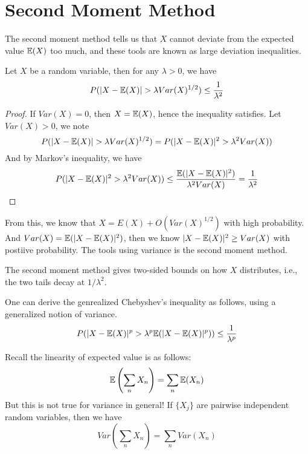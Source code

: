 \section{Second Moment Method}
The second moment method tells us that $X$ cannot deviate from the expected value $\mathbb{E}(X)$ too much, and these tools are known as large deviation inequalities.
\begin{thm}
    Let $X$ be a random variable, then for any $\lambda>0$, we have 
    \begin{equation*}
        P(|X-\E(X)|>\lambda Var(X)^{1/2})\leq\frac{1}{\lambda^2}
    \end{equation*}
\end{thm}
\begin{proof}
    If $Var(X)=0$, then $X=\mathbb{E}(X)$, hence the inequality satisfies. Let $Var(X)>0$, we note 
    \begin{equation*}
        P(|X-\E(X)|>\lambda Var(X)^{1/2})=P(|X-\E(X)|^2>\lambda^2 Var(X))
    \end{equation*}
    And by Markov's inequality, we have 
    \begin{equation*}
        P(|X-\mathbb{E}(X)|^2>\lambda^2 Var(X))\leq\frac{\mathbb{E}(|X-\mathbb{E}(X)|^2)}{\lambda^2Var(X)}=\frac{1}{\lambda^2}
    \end{equation*}
\end{proof}
From this, we know that $X=E(X)+O(Var(X)^{1/2})$ with high probability. And $Var(X)=\mathbb{E}(|X-\mathbb{E}(X)|^2)$, then we know $|X-\mathbb{E}(X)|^2\geq Var(X)$ with postiive probability. The tools using variance is the second moment method.
\begin{warn}
    The second moment method gives two-sided bounds on how $X$ distributes, i.e., the two tails decay at $1/\lambda^2$.
\end{warn}
\begin{example}
    One can derive the genrealized Chebyshev's inequality as follows, using a generalized notion of variance.
    \begin{equation*}
        P(|X-\mathbb{E}(X)|^p>\lambda^p \mathbb{E}(|X-\mathbb{E}(X)|^p))\leq\frac{1}{\lambda^p}
    \end{equation*}
\end{example}
Recall the linearity of expected value is as follows:
\begin{equation*}
    \mathbb{E}\left(\sum_n X_n\right)=\sum_n \mathbb{E}(X_n)
\end{equation*}
But this is not true for variance in general! If $\{X_j\}$ are pairwise independent random variables, then we have 
\begin{equation*}
    Var\left(\sum_n X_n\right)=\sum_nVar(X_n)
\end{equation*}
